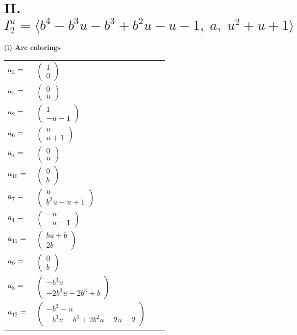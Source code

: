 \documentclass[1p]{elsarticle_modified}
\theoremstyle{definition}
\begin{document}
\centering \section*{II. $I^u_{2}= \langle b^4- b^3 u- b^3+b^2 u- u-1,\;a,\;u^2+u+1 \rangle$}
\flushleft \textbf{(i) Arc colorings}\\
\begin{tabular}{m{7pt} m{180pt} m{7pt} m{180pt} }
\flushright $a_{3}=$&$\begin{pmatrix}1\\0\end{pmatrix}$ \\
\flushright $a_{5}=$&$\begin{pmatrix}0\\u\end{pmatrix}$ \\
\flushright $a_{2}=$&$\begin{pmatrix}1\\- u-1\end{pmatrix}$ \\
\flushright $a_{6}=$&$\begin{pmatrix}u\\u+1\end{pmatrix}$ \\
\flushright $a_{4}=$&$\begin{pmatrix}0\\u\end{pmatrix}$ \\
\flushright $a_{10}=$&$\begin{pmatrix}0\\b\end{pmatrix}$ \\
\flushright $a_{7}=$&$\begin{pmatrix}u\\b^2 u+u+1\end{pmatrix}$ \\
\flushright $a_{1}=$&$\begin{pmatrix}- u\\- u-1\end{pmatrix}$ \\
\flushright $a_{11}=$&$\begin{pmatrix}b u+b\\2 b\end{pmatrix}$ \\
\flushright $a_{9}=$&$\begin{pmatrix}0\\b\end{pmatrix}$ \\
\flushright $a_{8}=$&$\begin{pmatrix}- b^3 u\\-2 b^3 u-2 b^3+b\end{pmatrix}$ \\
\flushright $a_{12}=$&$\begin{pmatrix}- b^2- u\\- b^3 u- b^3+2 b^2 u-2 u-2\end{pmatrix}$\\&\end{tabular}
\end{document}
